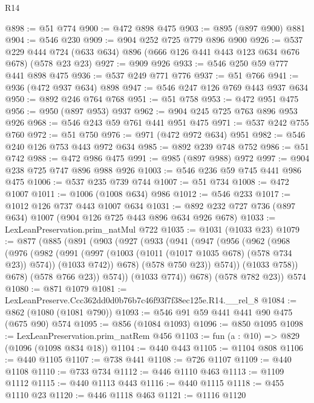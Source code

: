 \begin{lexlean}{R14}
\begin{coremodule}
@898 := @51 @774
@900 := @472 @898 @475
@903 := @895 (@897 @900) @881
@904 := @546 @230
@909 := @904 @252 @725 @779 @896 @900
@926 := @537
    @229
    @444
    @724
    (@633 @634)
    @896
    (@666 @126 @441 @443 @123 @634 @676 @678)
    (@578 @23 @23)
@927 := @909 @926
@933 := @546 @250 @59 @777 @441 @898 @475
@936 := @537 @249 @771 @776
@937 := @51 @766
@941 := @936 (@472 @937 @634) @898
@947 := @546 @247 @126 @769 @443 @937 @634
@950 := @892 @246 @764 @768
@951 := @51 @758
@953 := @472 @951 @475
@956 := @950 (@897 @953) @937
@962 := @904 @245 @725 @763 @896 @953 @926
@968 := @546 @243 @59 @761 @441 @951 @475
@971 := @537 @242 @755 @760
@972 := @51 @750
@976 := @971 (@472 @972 @634) @951
@982 := @546 @240 @126 @753 @443 @972 @634
@985 := @892 @239 @748 @752
@986 := @51 @742
@988 := @472 @986 @475
@991 := @985 (@897 @988) @972
@997 := @904 @238 @725 @747 @896 @988 @926
@1003 := @546 @236 @59 @745 @441 @986 @475
@1006 := @537 @235 @739 @744
@1007 := @51 @734
@1008 := @472 @1007
@1011 := @1006 (@1008 @634) @986
@1012 := @546 @233
@1017 := @1012 @126 @737 @443 @1007 @634
@1031 := @892 @232 @727 @736 (@897 @634) @1007 (@904 @126 @725 @443 @896 @634 @926 @678)
@1033 := LexLeanPreservation.prim_natMul @722
@1035 := @1031 (@1033 @23)
@1079 := @877
    (@885
      (@891
        (@903
          (@927
            (@933
              (@941
                (@947
                  (@956
                    (@962
                      (@968
                        (@976
                          (@982
                            (@991
                              (@997 (@1003 (@1011 (@1017 @1035 @678) (@578 @734 @23)) @574))
                              (@1033 @742))
                            @678)
                          (@578 @750 @23))
                        @574))
                    (@1033 @758))
                  @678)
                (@578 @766 @23))
              @574))
          (@1033 @774))
        @678)
      (@578 @782 @23))
    @574
@1080 := @871 @1079
@1081 := LexLeanPreserve.Ccc362dd0d0b76b7c46f93f7f38ec125e.R14.__rel_8
@1084 := @862 (@1080 (@1081 @790))
@1093 := @546 @91 @59 @441 @441 @90 @475 (@675 @90) @574
@1095 := @856 (@1084 @1093)
@1096 := @850 @1095
@1098 := LexLeanPreservation.prim_natRem @456
@1103 := fun (a : @10) => @829 (@1096 (@1098 @834 @18))
@1104 := @440 @443
@1105 := @1104 @808
@1106 := @440 @1105
@1107 := @738 @441
@1108 := @726 @1107
@1109 := @440 @1108
@1110 := @733 @734
@1112 := @446 @1110 @463
@1113 := @1109 @1112
@1115 := @440 @1113 @443
@1116 := @440 @1115
@1118 := @455 @1110 @23
@1120 := @446 @1118 @463
@1121 := @1116 @1120

\end{coremodule}
\end{lexlean}
